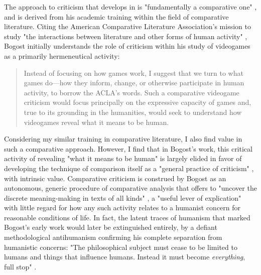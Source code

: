 The approach to criticism that \citeauthor{Bogost2006-ec} develops in  is "fundamentally a comparative one" \autocite[ix]{Bogost2006-ec}, and is derived from his academic training within the field of comparative literature. Citing the American Comparative Literature Association's mission to study "the interactions between literature and other forms of human activity" \autocite[50]{Bogost2006-ec}, Bogost initially understands the role of criticism within his study of videogames as a primarily hermeneutical activity:
\blockcquote[53]{Bogost2006-ec}{
  Instead of focusing on how games work, I suggest that we turn to what games do---how they inform, change, or otherwise participate in human activity, to borrow the ACLA's words. Such a comparative videogame criticism would focus principally on the expressive capacity of games and, true to its grounding in the humanities, would seek to understand how videogames reveal what it means to be human.
}
Considering my similar training in comparative literature, I also find value in such a comparative approach. However, I find that in Bogost's work, this critical activity of revealing "what it means to be human" is largely elided in favor of developing the technique of comparison itself as a "general practice of criticism" \autocite[15]{Bogost2006-ec}, with intrinsic value. Comparative criticism is construed by Bogost as an autonomous, generic procedure of comparative analysis that offers to "uncover the discrete meaning-making in texts of all kinds" \autocite[15]{Bogost2006-ec}, a "useful lever of explication" \autocite[54]{Bogost2006-ec} with little regard for how any such activity relates to a humanist concern for reasonable conditions of life. In fact, the latent traces of humanism that marked Bogost's early work would later be extinguished entirely, by a defiant methodological antihumanism confirming his complete separation from humanistic concerns: "The philosophical subject must cease to be limited to humans and things that influence humans. Instead it must become \emph{everything}, full stop" \autocite[10]{Bogost2012-wr}.

